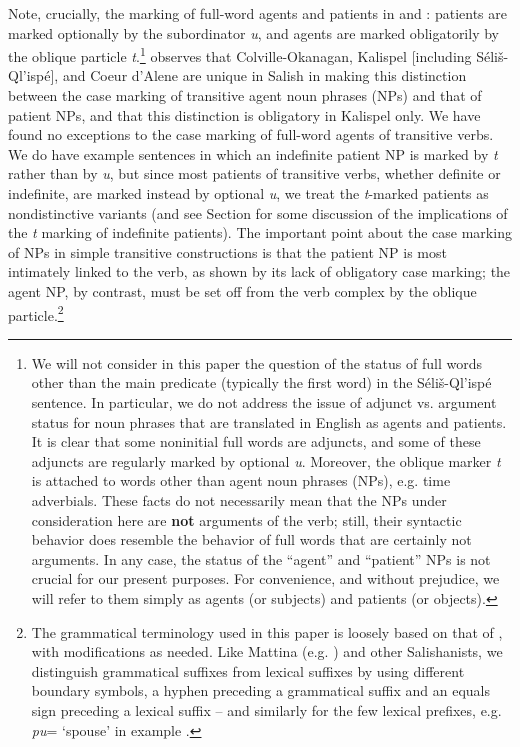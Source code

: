 \documentclass[output=paper,colorlinks,citecolor=brown]{langscibook}
\begin{document}
  Note, crucially, the marking of full-word agents and patients in 
  and : patients are marked optionally by the subordinator
  \emph{{\textltilde}u}, and agents are marked obligatorily by the
  oblique particle \emph{t}.\footnote{We will not consider in this
  paper the question of the status of full words other than the main
  predicate (typically the first word) in the S\'eli\v{s}-Ql'isp\'e
  sentence.  In particular, we do not address the issue of adjunct
  vs. argument status for noun phrases that are translated in English
  as agents and patients.  It is clear that some noninitial full
  words are adjuncts, and some of these adjuncts are regularly marked
  by optional \emph{{\textltilde}u}.  Moreover, the oblique marker
  \emph{t} is attached to words other than agent noun phrases (NPs),
  e.g.  time adverbials.  These facts do not necessarily mean that
  the NPs under consideration here are \textbf{not} arguments of the
  verb; still, their syntactic behavior does resemble the behavior of
  full words that are certainly not arguments.  In any case, the
  status of the ``agent'' and ``patient'' NPs is not crucial for our
  present purposes.  For convenience, and without prejudice, we will
  refer to them simply as agents (or subjects) and patients (or
  objects).  } \citet[52--53]{Kroeber:1999} observes that Colville-Okanagan,
  Kalispel [including S\'eli\v{s}-Ql'isp\'e], and Coeur d'Alene are
  unique in Salish in making this distinction between the case
  marking of transitive agent noun phrases (NPs) and that of patient
  NPs, and that this distinction is obligatory in Kalispel only.  We
  have found no exceptions to the case marking of full-word agents of
  transitive verbs.  We do have example sentences in which an
  indefinite patient NP is marked by \emph{t} rather than by \emph{{\textltilde}u}, but since most patients of transitive verbs,
  whether definite or indefinite, are marked instead by optional \emph{{\textltilde}u}, we treat the \emph{t}-marked patients as
  nondistinctive variants (and see Section  for some discussion of the
  implications of the \emph{t} marking of indefinite patients).  The
  important point about the case marking of NPs in simple transitive
  constructions is that the patient NP is most intimately linked to
  the verb, as shown by its lack of obligatory case marking; the
  agent NP, by contrast, must be set off from the verb complex by the
  oblique particle.\footnote{The grammatical terminology used in
  this paper is loosely based on that of \citet{Carlson:1972}, with
  modifications as needed.  Like Mattina (e.g. \citealt{Mattina:1987}) and other
  Salishanists, we distinguish grammatical suffixes from lexical
  suffixes by using different boundary symbols, a hyphen preceding a
  grammatical suffix and an equals sign preceding a lexical
  suffix -- and similarly for the few lexical prefixes, e.g. \emph{pu\textglotstop}= `spouse' in example .}
\end{document}
